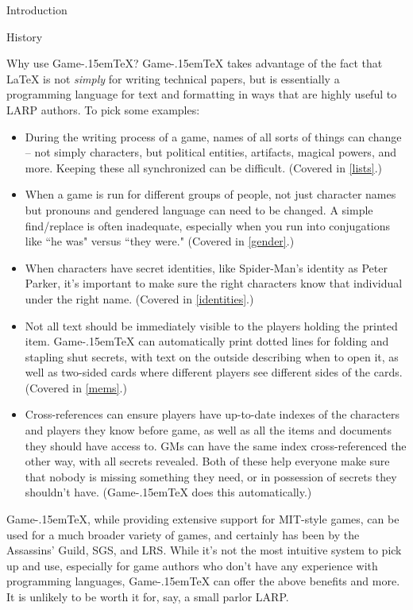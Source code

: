 \documentclass[11pt]{article}
\def\gametex{\mbox{Game\kern-.15em\TeX}}
\begin{document}
\begin{section}{Introduction}
\begin{subsection}{History}
\end{subsection}
\begin{subsection}{Why use \gametex{}?}
\gametex{} takes advantage of the fact that \LaTeX{} is not \textit{simply} for writing technical papers, but is essentially a programming language for text and formatting in ways that are highly useful to LARP authors.  To pick some examples:
\begin{itemize}
    \item During the writing process of a game, names of all sorts of things can change – not simply characters, but political entities, artifacts, magical powers, and more.  Keeping these all synchronized can be difficult.  (Covered in \ref{lists}.)
    \item When a game is run for different groups of people, not just character names but pronouns and gendered language can need to be changed.  A simple find/replace is often inadequate, especially when you run into conjugations like ``he was" versus ``they were."  (Covered in \ref{gender}.)
		\item When characters have secret identities, like Spider-Man's identity as Peter Parker, it's important to make sure the right characters know that individual under the right name.  (Covered in \ref{identities}.)
    \item Not all text should be immediately visible to the players holding the printed item.  \gametex{} can automatically print dotted lines for folding and stapling shut secrets, with text on the outside describing when to open it, as well as two-sided cards where different players see different sides of the cards.  (Covered in \ref{mems}.)
    \item Cross-references can ensure players have up-to-date indexes of the characters and players they know before game, as well as all the items and documents they should have access to.  GMs can have the same index cross-referenced the other way, with all secrets revealed.  Both of these help everyone make sure that nobody is missing something they need, or in possession of secrets they shouldn't have.  (\gametex{} does this automatically.)
\end{itemize}
\gametex{}, while providing extensive support for MIT-style games, can be used for a much broader variety of games, and certainly has been by the Assassins' Guild, SGS, and LRS.  
While it's not the most intuitive system to pick up and use, especially for game authors who don't have any experience with programming languages, \gametex{} can offer the above benefits and more.  It is unlikely to be worth it for, say, a small parlor LARP.


\end{subsection}
\end{section}
\end{document}

